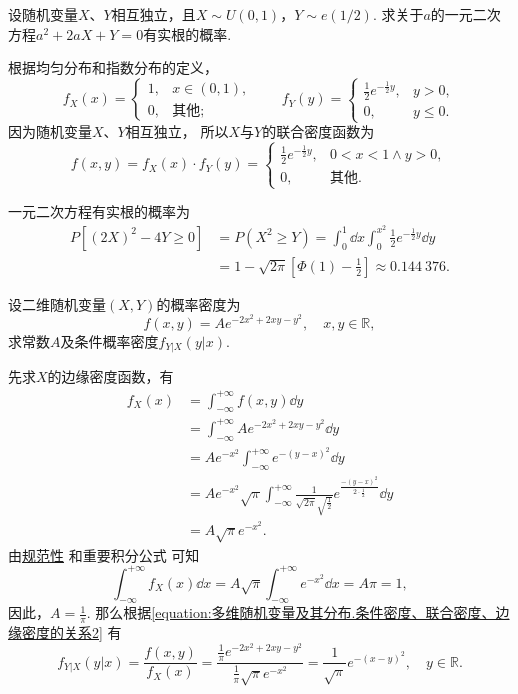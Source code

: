 \begin{example}
设随机变量\(X\)、\(Y\)相互独立，且\(X \sim U(0,1)\)，\(Y \sim e(1/2)\).
求关于\(a\)的一元二次方程\(a^2 + 2aX + Y = 0\)有实根的概率.
\begin{solution}
根据均匀分布和指数分布的定义，\[
	f_X(x) = \left\{ \begin{array}{cl}
		1, & x\in(0,1), \\
		0, & \text{其他};
	\end{array} \right.
	\qquad
	f_Y(y) = \left\{ \begin{array}{cl}
		\frac{1}{2} e^{-\frac{1}{2} y}, & y>0, \\
		0, & y \leq 0.
	\end{array} \right.
\]
因为随机变量\(X\)、\(Y\)相互独立，
所以\(X\)与\(Y\)的联合密度函数为\[
	f(x,y) = f_X(x) \cdot f_Y(y)
	= \left\{ \begin{array}{cl}
		\frac{1}{2} e^{-\frac{1}{2} y}, & 0<x<1 \land y>0, \\
		0, & \text{其他}.
	\end{array} \right.
\]

一元二次方程有实根的概率为\begin{align*}
	P[(2X)^2 - 4Y \geq 0]
	&= P(X^2 \geq Y)
	= \int_0^1 \dd{x} \int_0^{x^2} \frac{1}{2} e^{-\frac{1}{2} y} \dd{y} \\
	&= 1 - \sqrt{2\pi} \left[ \Phi(1) - \frac{1}{2} \right]
	\approx 0.144~376.
\end{align*}
\end{solution}
\end{example}

\begin{example}
设二维随机变量\((X,Y)\)的概率密度为\[
	f(x,y) = A e^{-2x^2+2xy-y^2}, \quad x,y\in\mathbb{R},
\]
求常数\(A\)及条件概率密度\(f_{Y \vert X}(y \vert x)\).
\begin{solution}
先求\(X\)的边缘密度函数，有\begin{align*}
	f_X(x) &= \int_{-\infty}^{+\infty} f(x,y) \dd{y} \\
	&= \int_{-\infty}^{+\infty} A e^{-2x^2+2xy-y^2} \dd{y} \\
	&= A e^{-x^2} \int_{-\infty}^{+\infty} e^{-(y-x)^2} \dd{y} \\
	&= A e^{-x^2} \sqrt{\pi} \int_{-\infty}^{+\infty}
		\frac{1}{\sqrt{2\pi} \sqrt{\frac{1}{2}}}
		e^{\frac{-(y-x)^2}{2 \cdot \frac{1}{2}}} \dd{y} \\
	&= A \sqrt{\pi} e^{-x^2}.
\end{align*}
由\hyperref[theorem:随机变量及其分布.连续型随机变量的密度函数的性质]{规范性}%
和重要积分公式  可知\[
	\int_{-\infty}^{+\infty} f_X(x) \dd{x}
	= A \sqrt{\pi} \int_{-\infty}^{+\infty} e^{-x^2} \dd{x}
	= A \pi = 1,
\]
因此，\(A = \frac{1}{\pi}\).
那么根据\cref{equation:多维随机变量及其分布.条件密度、联合密度、边缘密度的关系2} 有\[
	f_{Y \vert X}(y \vert x)
	= \frac{f(x,y)}{f_X(x)}
	= \frac{\frac{1}{\pi} e^{-2x^2+2xy-y^2}}{\frac{1}{\pi} \sqrt{\pi} e^{-x^2}}
	= \frac{1}{\sqrt{\pi}} e^{-(x-y)^2},
	\quad y\in\mathbb{R}.
\]
\end{solution}
\end{example}
